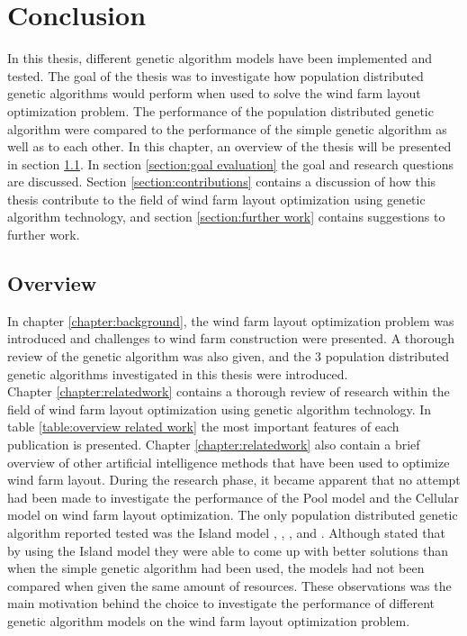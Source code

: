 \chapter{Conclusion}\label{chapter:conclusion}


\noindent In this thesis, different genetic algorithm models have been implemented and tested. The goal of the thesis was to investigate how population distributed genetic algorithms would perform when used to solve the wind farm layout optimization problem. The performance of the population distributed genetic algorithm were compared to the performance of the simple genetic algorithm as well as to each other. In this chapter, an overview of the thesis will be presented in section \ref{section:overview}. In section \ref{section:goal evaluation} the goal and research questions are discussed. Section \ref{section:contributions} contains a discussion of how this thesis contribute to the field of wind farm layout optimization using genetic algorithm technology, and section \ref{section:further work} contains suggestions to further work.\\


\section{Overview}\label{section:overview}


\noindent In chapter \ref{chapter:background}, the wind farm layout optimization problem was introduced and challenges to wind farm construction were presented. A thorough review of the genetic algorithm was also given, and the 3 population distributed genetic algorithms investigated in this thesis were introduced.\\


\noindent Chapter \ref{chapter:relatedwork} contains a thorough review of research within the field of wind farm layout optimization using genetic algorithm technology. In table \ref{table:overview related work} the most important features of each publication is presented. Chapter \ref{chapter:relatedwork} also contain a brief overview of other artificial intelligence methods that have been used to optimize wind farm layout. During the research phase, it became apparent that no attempt had been made to investigate the performance of the Pool model and the Cellular model on wind farm layout optimization. The only population distributed genetic algorithm reported tested was the Island model \cite{Grady}, \cite{Huang}, \cite{Wan}, \cite{Sisbot} and \cite{Gao}. Although \citep{Grady} stated that by using the Island model they were able to come up with better solutions than when the simple genetic algorithm had been used, the models had not been compared when given the same amount of resources. These observations was the main motivation behind the choice to investigate the performance of different genetic algorithm models on the wind farm layout optimization problem.\\ 


